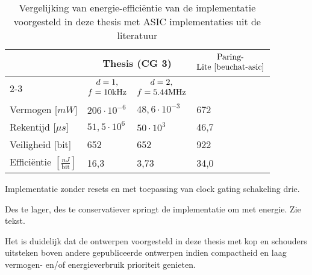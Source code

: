 \begin{table}[h]
	\caption{Vergelijking van energie-effici\"entie van de implementatie voorgesteld in deze thesis met ASIC implementaties uit de literatuur}
	\label{tabel-resultaten-energie}

	\begin{narrow}{-2cm}{-2cm}
		\centering
		\begin{tabular}{llll}
			\toprule
			&	\multicolumn{2}{c}{Thesis (CG 3)\footnotemark[2]}	& \multirow{3}{*}{$\begin{array}{@{}c@{}}\text{Paring-}\\\text{Lite \cite{beuchat-asic}}\end{array}$}\\
			\cmidrule(r){2-3}
			& \multicolumn{1}{c}{$\begin{array}{@{}c@{}}d = 1,\\f = 10\text{kHz}\end{array}$} & \multicolumn{1}{c}{$\begin{array}{@{}c@{}}d = 2,\\f = 5.44\text{MHz}\end{array}$} &\\
	 		\midrule
			Vermogen [$mW$]																& $206 \cdot 10^{-6}$		& $48,6 \cdot 10^{-3}$		& 672\\
			Rekentijd [$\mu s$]															& $51,5 \cdot 10^6$			& $50 \cdot 10^3$				& 46,7\\
			Veiligheid [bit]																& 652								& 652								& 922\\
			Effici\"entie $\left[ \frac{nJ}{\text{bit}}\right]$\footnotemark[3]	& 16,3					& 3,73							& 34,0\\
			\bottomrule		
		\end{tabular}
	\end{narrow}
		
	\footnotesize \footnotemark[2] Implementatie zonder resets en met toepassing van clock gating schakeling drie.
	
	\footnotemark[3] Des te lager, des te conservatiever springt de implementatie om met energie. Zie tekst.
\end{table}

Het is duidelijk dat de ontwerpen voorgesteld in deze thesis met kop en schouders uitsteken boven andere gepubliceerde ontwerpen indien compactheid en laag vermogen- en/of energieverbruik prioriteit genieten.
